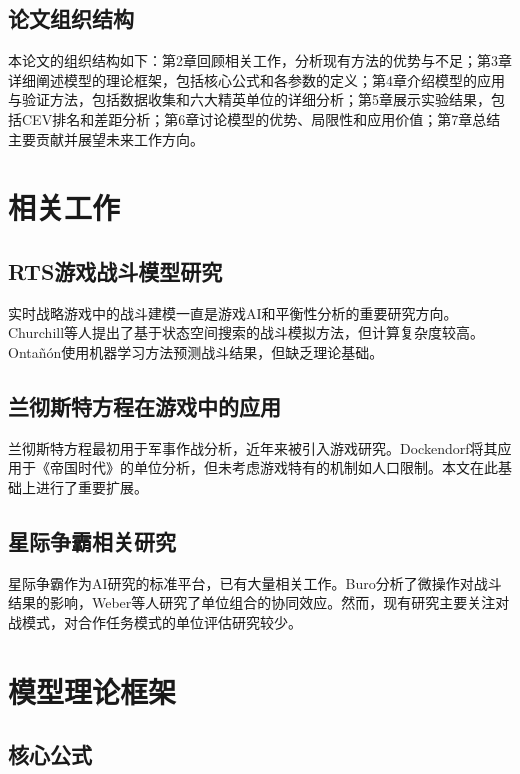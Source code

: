 \documentclass[a4paper,12pt]{article}
\begin{document}
\subsection{论文组织结构}

本论文的组织结构如下：第2章回顾相关工作，分析现有方法的优势与不足；第3章详细阐述模型的理论框架，包括核心公式和各参数的定义；第4章介绍模型的应用与验证方法，包括数据收集和六大精英单位的详细分析；第5章展示实验结果，包括CEV排名和差距分析；第6章讨论模型的优势、局限性和应用价值；第7章总结主要贡献并展望未来工作方向。

\section{相关工作}

\subsection{RTS游戏战斗模型研究}

实时战略游戏中的战斗建模一直是游戏AI和平衡性分析的重要研究方向。Churchill等人\cite{churchill2013portfolio}提出了基于状态空间搜索的战斗模拟方法，但计算复杂度较高。Ontañón\cite{ontanon2013combinatorial}使用机器学习方法预测战斗结果，但缺乏理论基础。

\subsection{兰彻斯特方程在游戏中的应用}

兰彻斯特方程最初用于军事作战分析，近年来被引入游戏研究。Dockendorf\cite{dockendorf2001combat}将其应用于《帝国时代》的单位分析，但未考虑游戏特有的机制如人口限制。本文在此基础上进行了重要扩展。

\subsection{星际争霸相关研究}

星际争霸作为AI研究的标准平台，已有大量相关工作。Buro\cite{buro2003real}分析了微操作对战斗结果的影响，Weber等人\cite{weber2011building}研究了单位组合的协同效应。然而，现有研究主要关注对战模式，对合作任务模式的单位评估研究较少。

\section{模型理论框架}

\subsection{核心公式}
\end{document}
